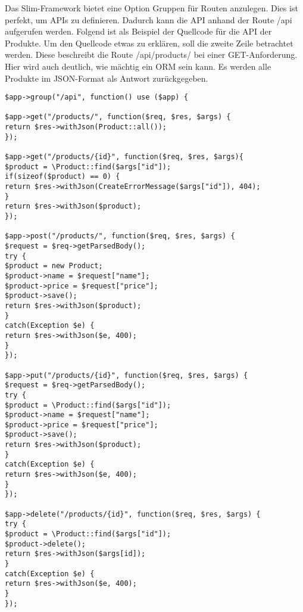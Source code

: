 Das Slim-Framework bietet eine Option Gruppen für Routen anzulegen. Dies ist perfekt, um \ac{API}s zu definieren. Dadurch kann die \ac{API} anhand der Route /api aufgerufen werden. Folgend ist als Beispiel der Quellcode für die \ac{API} der Produkte. Um den Quellcode etwas zu erklären, soll die zweite Zeile betrachtet werden. Diese beschreibt die Route /api/products/ bei einer GET-Anforderung. Hier wird auch deutlich, wie mächtig ein \ac{ORM} sein kann. Es werden alle Produkte im \ac{JSON}-Format als Antwort zurückgegeben.
\lstset{language=PHP} 
\begin{lstlisting}[frame=single]
$app->group("/api", function() use ($app) {  

$app->get("/products/", function($req, $res, $args) {
return $res->withJson(Product::all());
});

$app->get("/products/{id}", function($req, $res, $args){
$product = \Product::find($args["id"]);
if(sizeof($product) == 0) {
return $res->withJson(CreateErrorMessage($args["id"]), 404);
}
return $res->withJson($product);
});

$app->post("/products/", function($req, $res, $args) {
$request = $req->getParsedBody();
try {
$product = new Product;
$product->name = $request["name"];
$product->price = $request["price"];
$product->save();
return $res->withJson($product);
}
catch(Exception $e) {
return $res->withJson($e, 400);
}
});

$app->put("/products/{id}", function($req, $res, $args) {
$request = $req->getParsedBody();
try {
$product = \Product::find($args["id"]);
$product->name = $request["name"];
$product->price = $request["price"];
$product->save();
return $res->withJson($product);
}
catch(Exception $e) {
return $res->withJson($e, 400);
}
});

$app->delete("/products/{id}", function($req, $res, $args) {
try {
$product = \Product::find($args["id"]);
$product->delete();
return $res->withJson($args[id]);
}
catch(Exception $e) {
return $res->withJson($e, 400);
}
});
\end{lstlisting}